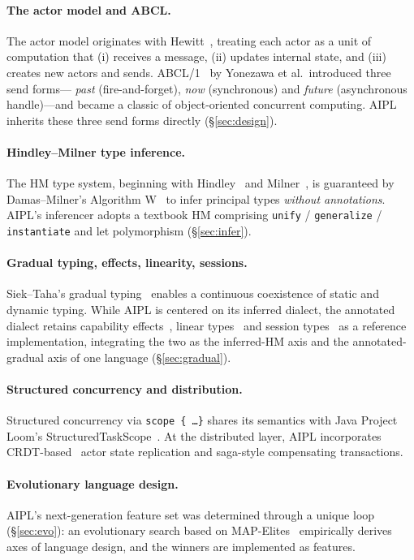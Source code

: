 \documentclass[11pt,a4paper]{article}
\newcommand{\code}[1]{\texttt{\small #1}}
\begin{document}
\paragraph{The actor model and ABCL.}
The actor model originates with Hewitt~\cite{hewitt}, treating each
actor as a unit of computation that (i) receives a message,
(ii) updates internal state, and (iii) creates new actors and sends.
ABCL/1~\cite{abcl1} by Yonezawa et al.\ introduced three send forms---%
\emph{past} (fire-and-forget), \emph{now} (synchronous) and
\emph{future} (asynchronous handle)---and became a classic of
object-oriented concurrent computing. AIPL inherits these three send
forms directly (\S\ref{sec:design}).

\paragraph{Hindley--Milner type inference.}
The HM type system, beginning with Hindley~\cite{hindley} and
Milner~\cite{milner}, is guaranteed by Damas--Milner's Algorithm
\textsf{W}~\cite{damas} to infer principal types \emph{without
annotations}. AIPL's inferencer adopts a textbook HM comprising
\code{unify} / \code{generalize} / \code{instantiate} and let
polymorphism (\S\ref{sec:infer}).

\paragraph{Gradual typing, effects, linearity, sessions.}
Siek--Taha's gradual typing~\cite{gradual} enables a continuous
coexistence of static and dynamic typing. While AIPL is centered on its
inferred dialect, the annotated dialect retains capability
effects~\cite{capability}, linear types~\cite{linear} and session
types~\cite{session} as a reference implementation, integrating the two
as the inferred-HM axis and the annotated-gradual axis of one language
(\S\ref{sec:gradual}).

\paragraph{Structured concurrency and distribution.}
Structured concurrency via \code{scope \{ \dots \}} shares its semantics
with Java Project Loom's \textsf{StructuredTaskScope}~\cite{loom}.
At the distributed layer, AIPL incorporates CRDT-based~\cite{crdt} actor
state replication and saga-style compensating transactions.

\paragraph{Evolutionary language design.}
AIPL's next-generation feature set was determined through a unique loop
(\S\ref{sec:evo}): an evolutionary search based on
MAP-Elites~\cite{mapelites} empirically derives axes of language design,
and the winners are implemented as features.
\end{document}
